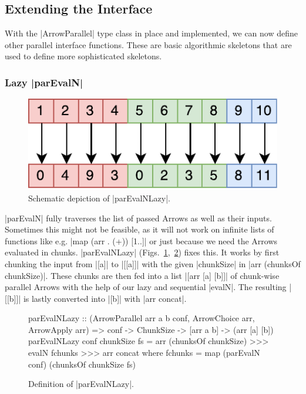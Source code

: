 \subsection{Extending the Interface}
\label{sec:extending-interface}
With the |ArrowParallel| type class in place and implemented, we can now define other parallel interface functions. These are basic algorithmic skeletons that are used to define more sophisticated  skeletons.

\subsubsection{Lazy |parEvalN|}
\begin{figure}[tb]
	\includegraphics[scale=0.7]{images/parEvalNLazy}
	\caption{Schematic depiction of |parEvalNLazy|.}
	\label{fig:parEvalNLazyImg}
\end{figure}
|parEvalN| fully traverses the list of passed Arrows as well as their inputs. Sometimes this might not be feasible, as it will not work on infinite lists of functions like e.g. |map (arr . (+)) [1..]| or just because we need the Arrows evaluated in chunks. |parEvalNLazy| (Figs.~\ref{fig:parEvalNLazyImg},~\ref{fig:parEvalNLazy}) fixes this. It works by first chunking the input from |[a]| to |[[a]]| with the given |chunkSize| in |arr (chunksOf chunkSize)|. These chunks are then fed into a list |[arr [a] [b]]| of chunk-wise parallel Arrows with the help of our lazy and sequential |evalN|. The resulting |[[b]]| is lastly converted into |[b]| with |arr concat|.
\begin{figure}[t]
\begin{code}
parEvalNLazy :: (ArrowParallel arr a b conf, ArrowChoice arr, ArrowApply arr) =>
	conf -> ChunkSize -> [arr a b] -> (arr [a] [b])
parEvalNLazy conf chunkSize fs =
	arr (chunksOf chunkSize) >>>
    evalN fchunks >>>
    arr concat
    where
      fchunks = map (parEvalN conf) (chunksOf chunkSize fs)
\end{code} %
\caption{Definition of |parEvalNLazy|.}
\label{fig:parEvalNLazy}
\end{figure}

